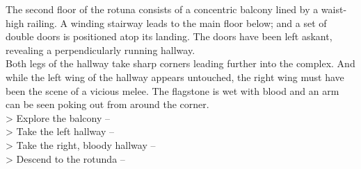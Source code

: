 The second floor of the rotuna consists of a concentric balcony lined by a waist-high railing. A winding stairway leads to the main floor below; and a set of double doors is positioned atop its landing. The doors have been left askant, revealing a perpendicularly running hallway.\\

Both legs of the hallway take sharp corners leading further into the complex. And while the left wing of the hallway appears untouched, the right wing must have been the scene of a vicious melee. The flagstone is wet with blood and an arm can be seen poking out from around the corner.\\

> Explore the balcony -- \\
> Take the left hallway -- \\
> Take the right, bloody hallway -- \\
> Descend to the rotunda -- 